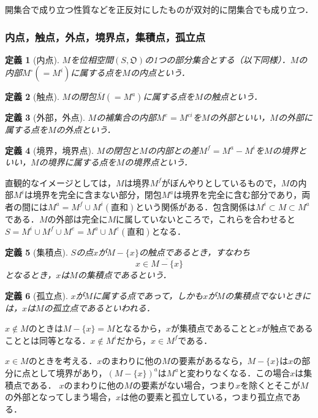 \documentclass[a4paper,10pt,uplatex]{jsarticle}
\numberwithin{equation}{section}
\theoremstyle{mystyle}
\newtheorem{dfn}{定義}[section]
\newcommand{\gO}{\mathfrak{O}}
\begin{document}
開集合で成り立つ性質などを正反対にしたものが双対的に閉集合でも成り立つ．

\subsubsection{内点，触点，外点，境界点，集積点，孤立点}
\begin{dfn}[内点]
    $M$を位相空間$(S,\gO)$の1つの部分集合とする（以下同様）．$M$の内部$M^\circ(=M^i)$に属する点を$M$の内点という．
\end{dfn}

\begin{dfn}[触点]
    $M$の閉包$\bar{M}(=M^a)$に属する点を$M$の触点という．
\end{dfn}

\begin{dfn}[外部，外点]
    $M$の補集合の内部$M^e = M^{ci}$を$M$の外部といい，$M$の外部に属する点を$M$の外点という．
\end{dfn}

\begin{dfn}[境界，境界点]
    $M$の閉包と$M$の内部との差$M^f = M^a-M^i$を$M$の境界といい，$M$の境界に属する点を$M$の境界点という．
\end{dfn}

直観的なイメージとしては，$M$は境界$M^f$がぼんやりとしているもので，$M$の内部$M^i$は境界を完全に含まない部分，閉包$M^a$は境界を完全に含む部分であり，両者の間には$M^a = M^f \cup M^i(直和)$という関係がある．包含関係は$M^i \subset M \subset M^a$である．$M$の外部は完全に$M$に属していないところで，これらを合わせると$S = M^i \cup M^f \cup M^e = M^a \cup M^e(直和)$となる．

\begin{dfn}[集積点]
    $S$の点$x$が$M-\{x\}$の触点であるとき，すなわち
    \begin{equation}
        x \in \overline{M-\{x\}}
    \end{equation}
    となるとき，$x$は$M$の集積点であるという．
\end{dfn}

\begin{dfn}[孤立点]
    $x$が$M$に属する点であって，しかも$x$が$M$の集積点でないときには，$x$は$M$の孤立点であるといわれる．
\end{dfn}

$x \notin M$のときは$M-\{x\} = M$となるから，$x$が集積点であることと$x$が触点であることとは同等となる．$x \notin M^i$だから，$x \in M^f$である．

$x \in M$のときを考える．$x$のまわりに他の$M$の要素があるなら，$M-\{x\}$は$x$の部分に点として境界があり，$(M-\{x\})^a$は$M^a$と変わりなくなる．この場合$x$は集積点である．
$x$のまわりに他の$M$の要素がない場合，つまり$x$を除くとそこが$M$の外部となってしまう場合，$x$は他の要素と孤立している，つまり孤立点である．
\end{document}
